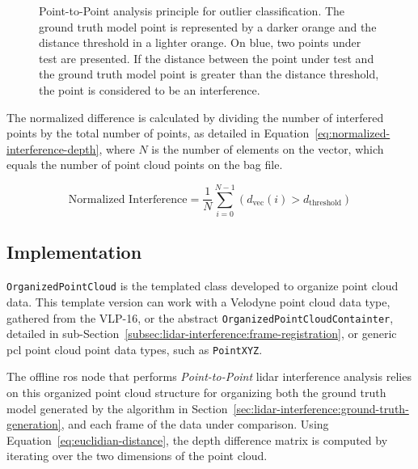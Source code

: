 \begin{figure}[!ht]
	\centering
	\def\svgwidth{0.8\textwidth}
	\fontsize{14}{18}\selectfont
	\graphicspath{{img/lidar-interference/point-to-point-analysis/}}
	
	\caption[Point-to-Point analysis principle for outlier classification.]{Point-to-Point analysis principle for outlier classification. The ground truth model point is represented by a darker orange and the distance threshold in a lighter orange. On blue, two points under test are presented. If the distance between the point under test and the ground truth model point is greater than the distance threshold, the point is considered to be an interference.}
	\label{fig:point-to-point-principle}
\end{figure}

The normalized difference is calculated by dividing the number of interfered points by the total number of points, as detailed in Equation~\eqref{eq:normalized-interference-depth}, where $N$ is the number of elements on the vector, which equals the number of point cloud points on the bag file.

\begin{equation}
\label{eq:normalized-interference-depth}
\displaystyle
\text{Normalized Interference} = \frac{1}{N} \sum\limits^{N-1}_{i = 0} \left(d_{\text{vec}}(i)
> d_\text{threshold}\right)
\end{equation}

\subsection{Implementation}
\texttt{OrganizedPointCloud} is the templated class developed to organize point cloud data. This template version can work with a Velodyne point cloud data type, gathered from the VLP-16, or the abstract \texttt{OrganizedPointCloudContainter}, detailed in sub-Section~\ref{subsec:lidar-interference:frame-registration}, or generic \ac{pcl} point cloud point data types, such as \texttt{PointXYZ}.

The offline \ac{ros} node that performs \textit{Point-to-Point} \ac{lidar} interference analysis relies on this organized point cloud structure for organizing both the ground truth model generated by the algorithm in Section~\ref{sec:lidar-interference:ground-truth-generation}, and each frame of the data under comparison. Using Equation~\eqref{eq:euclidian-distance}, the depth difference matrix is computed by iterating over the two dimensions of the point cloud. 

